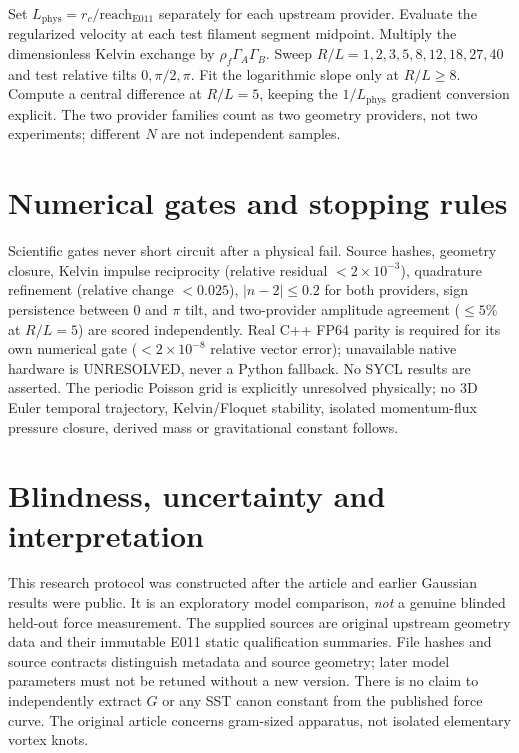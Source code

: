 \documentclass[11pt,a4paper]{article}
\newcommand{\rhoF}{\rho_{\!f}}
\newcommand{\rc}{r_c}
\begin{document}
Set $L_{\mathrm{phys}}=\rc/\mathrm{reach}_{\mathrm{E011}}$ separately for each upstream provider. Evaluate the regularized velocity at each test filament segment midpoint. Multiply the dimensionless Kelvin exchange by $\rhoF\Gamma_A\Gamma_B$. Sweep $R/L=1,2,3,5,8,12,18,27,40$ and test relative tilts $0,\pi/2,\pi$. Fit the logarithmic slope only at $R/L\ge8$. Compute a central difference at $R/L=5$, keeping the $1/L_{\mathrm{phys}}$ gradient conversion explicit. The two provider families count as two geometry providers, not two experiments; different $N$ are not independent samples.
\section{Numerical gates and stopping rules}
Scientific gates never short circuit after a physical fail. Source hashes, geometry closure, Kelvin impulse reciprocity (relative residual $<2\times10^{-3}$), quadrature refinement (relative change $<0.025$), $|n-2|\le0.2$ for both providers, sign persistence between $0$ and $\pi$ tilt, and two-provider amplitude agreement ($\le5\%$ at $R/L=5$) are scored independently. Real C++ FP64 parity is required for its own numerical gate ($<2\times10^{-8}$ relative vector error); unavailable native hardware is UNRESOLVED, never a Python fallback. No SYCL results are asserted. The periodic Poisson grid is explicitly unresolved physically; no 3D Euler temporal trajectory, Kelvin/Floquet stability, isolated momentum-flux pressure closure, derived mass or gravitational constant follows.
\section{Blindness, uncertainty and interpretation}
This research protocol was constructed after the article and earlier Gaussian results were public. It is an exploratory model comparison, \emph{not} a genuine blinded held-out force measurement. The supplied sources are original upstream geometry data and their immutable E011 static qualification summaries. File hashes and source contracts distinguish metadata and source geometry; later model parameters must not be retuned without a new version. There is no claim to independently extract $G$ or any SST canon constant from the published force curve. The original article concerns gram-sized apparatus, not isolated elementary vortex knots.
\end{document}
